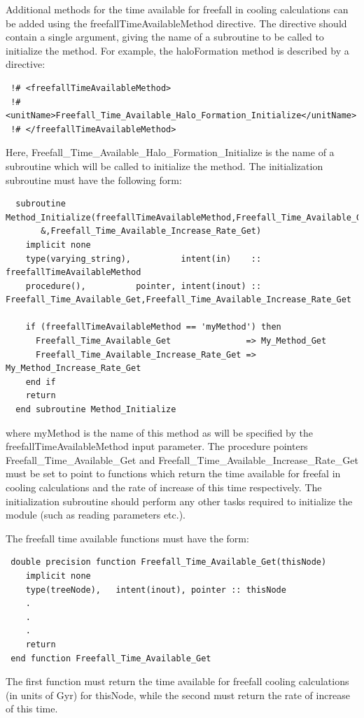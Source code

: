 Additional methods for the time available for freefall in cooling calculations can be added using the {\normalfont \ttfamily freefallTimeAvailableMethod} directive. The directive should contain a single argument, giving the name of a subroutine to be called to initialize the method. For example, the {\normalfont \ttfamily haloFormation} method is described by a directive:
\begin{verbatim}
 !# <freefallTimeAvailableMethod>
 !#  <unitName>Freefall_Time_Available_Halo_Formation_Initialize</unitName>
 !# </freefallTimeAvailableMethod>
\end{verbatim}
Here, {\normalfont \ttfamily Freefall\_Time\_Available\_Halo\_Formation\_Initialize} is the name of a subroutine which will be called to initialize the method. The initialization subroutine must have the following form:
\begin{verbatim}
  subroutine Method_Initialize(freefallTimeAvailableMethod,Freefall_Time_Available_Get&
       &,Freefall_Time_Available_Increase_Rate_Get)
    implicit none
    type(varying_string),          intent(in)    :: freefallTimeAvailableMethod
    procedure(),          pointer, intent(inout) :: Freefall_Time_Available_Get,Freefall_Time_Available_Increase_Rate_Get
    
    if (freefallTimeAvailableMethod == 'myMethod') then
      Freefall_Time_Available_Get               => My_Method_Get
      Freefall_Time_Available_Increase_Rate_Get => My_Method_Increase_Rate_Get
    end if
    return
  end subroutine Method_Initialize
\end{verbatim}
where {\normalfont \ttfamily myMethod} is the name of this method as will be specified by the {\normalfont \ttfamily freefallTimeAvailableMethod} input parameter. The procedure pointers {\normalfont \ttfamily Freefall\_Time\_Available\_Get} and {\normalfont \ttfamily Freefall\_Time\_Available\_Increase\_Rate\_Get} must be set to point to functions which return the time available for freefal in cooling calculations and the rate of increase of this time respectively. The initialization subroutine should perform any other tasks required to initialize the module (such as reading parameters etc.).

The freefall time available functions must have the form:
\begin{verbatim}
 double precision function Freefall_Time_Available_Get(thisNode)
    implicit none
    type(treeNode),   intent(inout), pointer :: thisNode
    .
    .
    .
    return
 end function Freefall_Time_Available_Get
\end{verbatim}
The first function must return the time available for freefall cooling calculations (in units of Gyr) for {\normalfont \ttfamily thisNode}, while the second must return the rate of increase of this time. 

